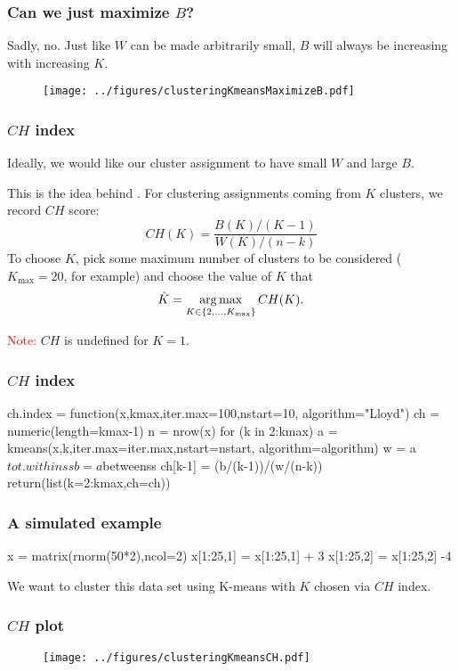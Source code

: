 \documentclass{beamer}
\begin{document}
\begin{frame}[fragile]
\frametitle{Can we just maximize $B$?}
Sadly, no.  Just like $W$ can be made arbitrarily small, $B$ will always be increasing
with increasing $K$.
\begin{figure}[h!]
  \centering
  \texttt{[image: ../figures/clusteringKmeansMaximizeB.pdf]}  
\end{figure}
\end{frame}

\begin{frame}[fragile]
\frametitle{$CH$ index}
Ideally, we would like our cluster assignment to  have small $W$ and large $B$.
\vsp

This is the idea behind .  For clustering assignments coming from $K$
clusters, we record $CH$ score:
\[
CH(K) = \frac{B(K)/(K-1)}{W(K)/(n-k)} 
\]
To choose $K$, pick some maximum number of clusters to be considered ($K_{\max} = 20$,
for example)  and choose the value of $K$ that
\[
\hat K = \operatorname*{arg\,max}_{K \in \{ 2,\ldots, K_{\max} \}} CH(K).
\]

\textcolor{red}{Note:} $CH$ is undefined for $K =1$.

\vsp
{}
\end{frame}

\begin{frame}[fragile]
\frametitle{$CH$ index}
\begin{blockcode}
ch.index = function(x,kmax,iter.max=100,nstart=10,
                      algorithm="Lloyd")
{
  ch = numeric(length=kmax-1)
  n = nrow(x)
  for (k in 2:kmax) {
    a = kmeans(x,k,iter.max=iter.max,nstart=nstart,
              algorithm=algorithm)
    w = a$tot.withinss
    b = a$betweenss
   ch[k-1] = (b/(k-1))/(w/(n-k))
  }
  return(list(k=2:kmax,ch=ch))
}
\end{blockcode}
\end{frame}

\begin{frame}[fragile]
\frametitle{A simulated example}
\begin{blockcode}
x = matrix(rnorm(50*2),ncol=2)
x[1:25,1] = x[1:25,1] + 3
x[1:25,2] = x[1:25,2] -4
\end{blockcode}
\vsp

We want to cluster this data set using K-means with $K$ chosen via $CH$ index.
\end{frame}

\begin{frame}[fragile]
\frametitle{$CH$ plot}
\begin{figure}[h!]
  \centering
  \texttt{[image: ../figures/clusteringKmeansCH.pdf]}  
\end{figure}
\end{frame}
\end{document}
